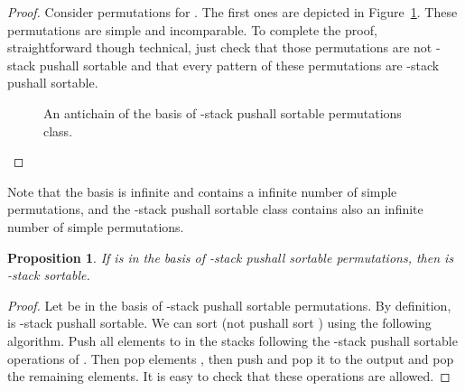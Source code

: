 \documentclass[11pt]{article}
\newtheorem{prop}[thm]{Proposition}
\newcommand{\pushall}{-stack pushall sortable\xspace}
\newcounter{indice}
\newcommand{\permutation}[1]{
\setcounter{indice}{0};
\foreach \i in {#1} 
\addtocounter{indice}{1};

\addtocounter{indice}{1}
\draw [help lines] (1,1) grid (\theindice,\theindice);

\setcounter{indice}{1};

\foreach \i in { #1 } {
\draw (\theindice+.5,\i+.5) [fill] circle (.2);
\addtocounter{indice}{1};
}
\addtocounter{indice}{-1};
}
\begin{document}
\begin{proof}
Consider permutations  for .
The first ones are depicted in Figure~\ref{fig:antichaine}. These permutations are simple and incomparable.
To complete the proof, straightforward though technical, just check that those permutations are not \pushall and that every pattern 
of these permutations are \pushall.

\begin{figure}[ht]
\begin{center}
\caption{An antichain of the basis of \pushall permutations class.}
\label{fig:antichaine}
\end{center}
\end{figure}

\end{proof}

Note that the basis is infinite and contains a infinite number of simple permutations, and the \pushall class contains also an infinite number of simple permutations.

\begin{prop}\label{prop:basePushallTriable}
If  is in the basis of \pushall permutations, then  is -stack sortable.
\end{prop}
\begin{proof}
Let  be in the basis of \pushall permutations. 
By definition,  is \pushall. 
We can sort  (not pushall sort ) using the following algorithm. 
Push all elements  to  in the stacks following the \pushall operations of . 
Then pop elements , then push  and pop it to the output and pop the remaining elements. 
It is easy to check that these operations are allowed.
\end{proof}
\end{document}
